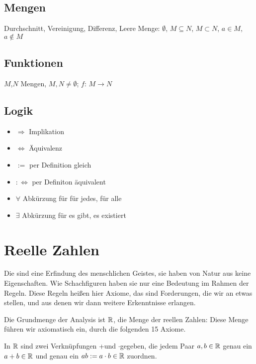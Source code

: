 \documentclass[a4paper,oneside,DIV15,BCOR12mm]{scrbook}
\begin{document}
\section{Mengen}

Durchschnitt, Vereinigung, Differenz, Leere Menge: $\emptyset$, $M\subseteq N$, $M\subset N$, $a \in M$, $a\notin M$

\section{Funktionen}

$M$,$N$ Mengen, $M,N \ne \emptyset$; $f:\, M\rightarrow N$

\section{Logik}

\begin{itemize}
\item $\Rightarrow$ Implikation
\item $\Leftrightarrow$ Äquivalenz
\item $:=$ per Definition gleich
\item $:\Leftrightarrow$ per Definiton äquivalent
\item $\forall$ Abkürzung für \glqq für jedes\grqq, \glqq für alle\grqq
\item $\exists$ Abkürzung für \glqq es gibt\grqq, \glqq es existiert\grqq
\end{itemize}



\renewcommand{\thechapter}{\arabic{chapter}}
\renewcommand{\chaptername}{§}
\setcounter{chapter}{0}

\chapter{Reelle Zahlen}

Die  sind eine Erfindung des menschlichen Geistes, sie haben von Natur aus keine Eigenschaften. Wie Schachfiguren haben sie nur eine Bedeutung im Rahmen der Regeln. Diese Regeln heißen hier Axiome, das sind Forderungen, die wir an etwas stellen, und aus denen wir dann weitere Erkenntnisse erlangen.

Die Grundmenge der Analysis ist $\mathbb{R}$, die Menge der reellen Zahlen: Diese Menge führen wir axiomatisch ein, durch die folgenden 15 Axiome.

In $\mathbb{R}$ sind zwei Verknüpfungen \glqq +\grqq und \glqq $\cdot$\grqq gegeben, die jedem Paar $a,b \in \mathbb{R}$ genau ein $ a+b \in \mathbb{R}$ und genau ein $ ab := a \cdot b \in \mathbb{R}$ zuordnen.
\end{document}
